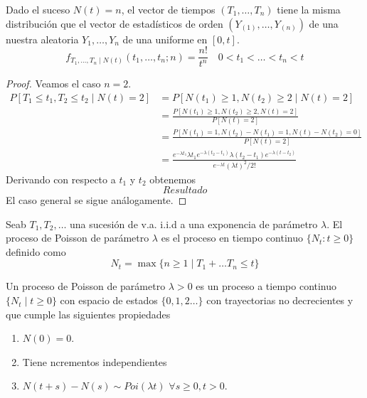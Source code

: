 \documentclass[PREyA.tex]{subfiles}
\begin{document}
\begin{prop}
Dado el suceso $N(t)=n$, el vector de tiempos $(T_1,\dotsc,T_n)$ tiene la misma distribución que el vector de estadísticos de orden $(Y_{(1)},\dotsc,Y_{(n)})$ de una nuestra aleatoria $Y_1,\dotsc,Y_n$ de una uniforme en $[0,t]$.
$$
f_{T_1,\dotsc,T_n\mid N(t)}(t_1,\dotsc,t_n;n) = \frac{n!}{t^n} \quad 0<t_1<\dotsc<t_n < t
$$
\end{prop}
\begin{proof}
Veamos el caso $n=2$.
\begin{align*}
P[T_1\leq t_1,T_2 \leq t_2 \mid N(t)=2] & = P[N(t_1) \geq 1, N(t_2)\geq 2 \mid N(t)=2]\\
&= \frac{ P[N(t_1) \geq 1, N(t_2)\geq 2, N(t)=2]}{P[N(t)=2]}\\
&= \frac{P[N(t_1)=1,N(t_2)-N(t_1) =1, N(t)-N(t_2)=0]}{P[N(t)=2]}\\
&= \frac{e^{-\lambda t_1}\lambda t_1 e^{-\lambda(t_2-t_1)}\lambda(t_2-t_1) e^{-\lambda(t-t_2)}}{e^{-\lambda t}(\lambda t)^2/2!}
\end{align*}
Derivando con respecto a $t_1$ y $t_2$ obtenemos 
$$
Resultado
$$
El caso general se sigue análogamente.
\end{proof}
\begin{defi}
Seab $T_1,T_2,\dotsc$ una sucesión de v.a. i.i.d  a una exponencia de parámetro $\lambda$. El proceso de Poisson de parámetro $\lambda$ es el proceso en tiempo continuo $\{N_t:t\geq 0\}$ definido como 
$$
N_t = \max\{n\geq 1\mid T_1+\dotsc T_n \leq t\}
$$
\end{defi}
\begin{defi}
Un proceso de Poisson de parámetro $\lambda > 0$ es un proceso a tiempo continuo $\{N_t \mid t\geq0\}$ con espacio de estados $\{0,1,2\dotsc\}$ con trayectorias no decrecientes y que cumple las siguientes propiedades
\begin{enumerate}
\item $N(0)=0$.
\item Tiene ncrementos independientes
\item $N(t+s)-N(s) \sim Poi(\lambda t)$ $\forall s\geq 0, t>0$.
\end{enumerate}
\end{defi}
\end{document}
